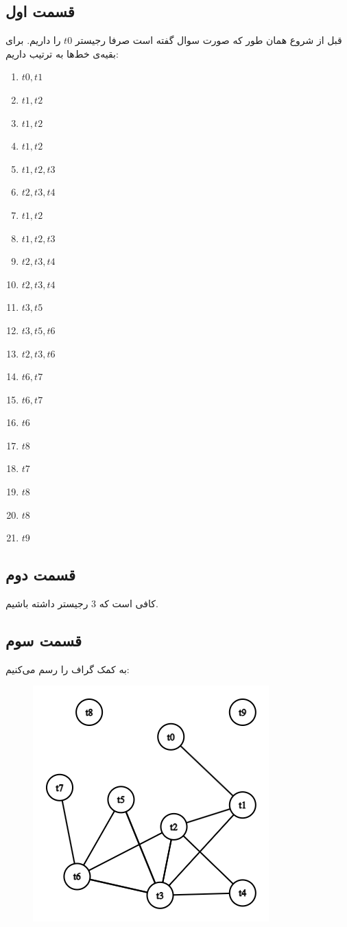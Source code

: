 \documentclass[]{article}
\begin{document}
\subsection*{قسمت اول}
قبل از شروع همان طور که صورت سوال گفته است صرفا رجیستر
$t0$
را داریم. برای بقیه‌ی خط‌ها به ترتیب داریم:
\begin{enumerate}
    \item $t0, t1$
    \item $t1, t2$
    \item $t1, t2$
    \item $t1, t2$
    \item $t1, t2, t3$
    \item $t2, t3, t4$
    \item $t1, t2$
    \item $t1, t2, t3$
    \item $t2, t3, t4$
    \item $t2, t3, t4$
    \item $t3, t5$
    \item $t3, t5, t6$
    \item $t2, t3, t6$
    \item $t6, t7$
    \item $t6, t7$
    \item $t6$
    \item $t8$
    \item $t7$
    \item $t8$
    \item $t8$
    \item $t9$
\end{enumerate}
\subsection*{قسمت دوم}
کافی است که 3 رجیستر داشته باشیم.
\subsection*{قسمت سوم}
به کمک
گراف را رسم می‌کنیم:
\begin{figure}[H]
    \centering
    \includegraphics[scale=0.5]{figure/Q6-c.png}
\end{figure}
\end{document}

